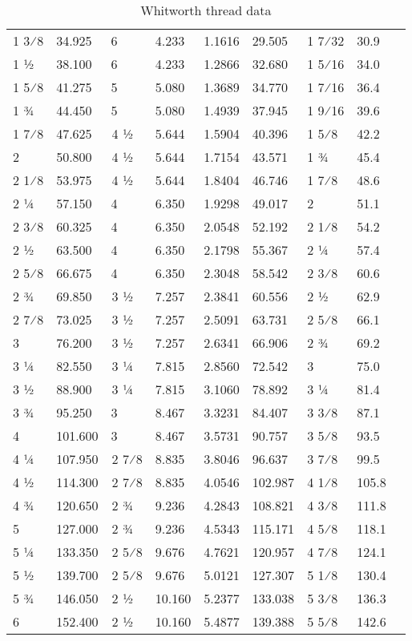 \begin{table}[h!]
\begin{longtable}{lll|ll|llll}
1 3⁄8 &34.925 &6 &4.233 &1.1616 &29.505 &1 7⁄32 &30.9\\
1 1⁄2 &38.100 &6 &4.233 &1.2866 &32.680 &1 5⁄16 &34.0\\
1 5⁄8 &41.275 &5 &5.080 &1.3689 &34.770 &1 7⁄16 &36.4\\
1 3⁄4 &44.450 &5 &5.080 &1.4939 &37.945 &1 9⁄16 &39.6\\
1 7⁄8 &47.625 & 4 1⁄2 &5.644 &1.5904 &40.396 &1 5⁄8 &42.2\\
2 &50.800 & 4 1⁄2 &5.644 &1.7154 &43.571 &1 3⁄4 &45.4\\
2 1⁄8 &53.975 & 4 1⁄2 &5.644 &1.8404 &46.746 &1 7⁄8 &48.6\\
2 1⁄4 &57.150 &4 &6.350 &1.9298 &49.017 &2 &51.1\\
2 3⁄8 &60.325 &4 &6.350 &2.0548 &52.192 &2 1⁄8 &54.2\\
2 1⁄2 &63.500 &4 &6.350 &2.1798 &55.367 &2 1⁄4 &57.4\\
2 5⁄8 &66.675 &4 &6.350 &2.3048 &58.542 &2 3⁄8 &60.6\\
2 3⁄4 &69.850 & 3 1⁄2 &7.257 &2.3841 &60.556 &2 1⁄2 &62.9\\
2 7⁄8 &73.025 & 3 1⁄2 &7.257 &2.5091 &63.731 &2 5⁄8 &66.1\\
3 &76.200 & 3 1⁄2 &7.257 &2.6341 &66.906 &2 3⁄4 &69.2\\
3 1⁄4 &82.550 & 3 1⁄4 &7.815 &2.8560 &72.542 &3 &75.0\\
3 1⁄2 &88.900 & 3 1⁄4 &7.815 &3.1060 &78.892 &3 1⁄4 &81.4\\
3 3⁄4 &95.250 &3 &8.467 &3.3231 &84.407 &3 3⁄8 &87.1\\
4 &101.600 &3 &8.467 &3.5731 &90.757 &3 5⁄8 &93.5\\
4 1⁄4 &107.950 & 2 7⁄8 &8.835 &3.8046 &96.637 &3 7⁄8 &99.5\\
4 1⁄2 &114.300 & 2 7⁄8 &8.835 &4.0546 &102.987 &4 1⁄8 &105.8\\
4 3⁄4 &120.650 & 2 3⁄4 &9.236 &4.2843 &108.821 &4 3⁄8 &111.8\\
5 &127.000 & 2 3⁄4 &9.236 &4.5343 &115.171 &4 5⁄8 &118.1\\
5 1⁄4 &133.350 & 2 5⁄8 &9.676 &4.7621 &120.957 &4 7⁄8 &124.1\\
5 1⁄2 &139.700 & 2 5⁄8 &9.676 &5.0121 &127.307 &5 1⁄8 &130.4\\
5 3⁄4 &146.050 & 2 1⁄2 &10.160 &5.2377 &133.038 &5 3⁄8 &136.3\\
6 &152.400 & 2 1⁄2 &10.160 &5.4877 &139.388 &5 5⁄8 &142.6\\
\end{longtable}
\caption{Whitworth thread data}
\end{table}

